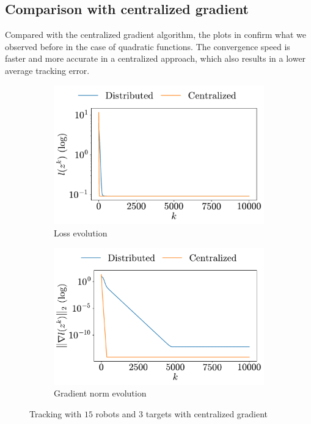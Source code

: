 \documentclass[a4paper,11pt,oneside]{book}
\begin{document}
\subsection{Comparison with centralized gradient}

Compared with the centralized gradient algorithm, the plots in  confirm what we observed before in the case of quadratic functions. The convergence speed is faster and more accurate in a centralized approach, which also results in a lower average tracking error.

\begin{figure}[h!]
      \centering
      \begin{subfigure}[h]{0.43\linewidth}
            \centering
            \includegraphics[width=\linewidth]{./figs/tracking/centralized/loss.pdf} 
            \caption{Loss evolution}
      \end{subfigure}
      \hfill
      \begin{subfigure}[h]{0.43\linewidth}
            \centering
            \includegraphics[width=\linewidth]{./figs/tracking/centralized/gradient.pdf} 
            \caption{Gradient norm evolution}
      \end{subfigure}
      \caption{Tracking with $15$ robots and $3$ targets with centralized gradient}
      \label{fig:tracking_centralized_5_3}
\end{figure}
\end{document}
